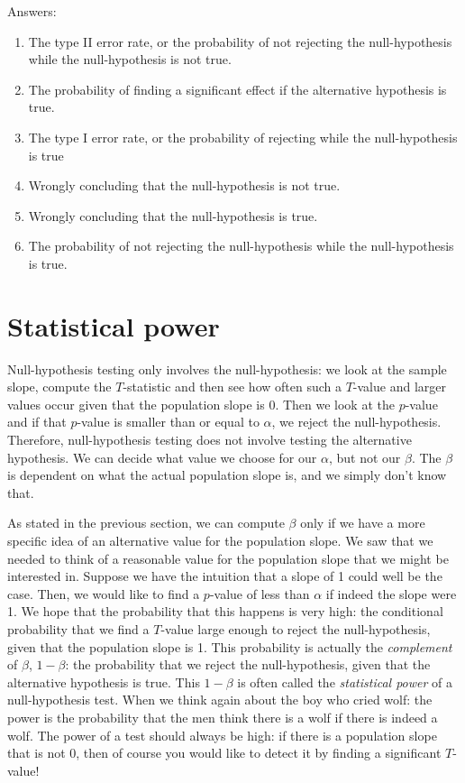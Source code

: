 \documentclass[]{report}\usepackage[]{graphicx}\usepackage[]{color}
\begin{document}
Answers:

\begin{enumerate}

\item The type II error rate, or the probability of not rejecting the null-hypothesis while the null-hypothesis is not true.

\item The probability of finding a significant effect if the alternative hypothesis is true.

\item The type I error rate, or the probability of rejecting while the null-hypothesis is true

\item Wrongly concluding that the null-hypothesis is not true.

\item Wrongly concluding that the null-hypothesis is true.

\item The probability of not rejecting the null-hypothesis while the null-hypothesis is true.


\end{enumerate}


\section{Statistical power}

Null-hypothesis testing only involves the null-hypothesis: we look at the sample slope, compute the $T$-statistic and then see how often such a $T$-value and larger values occur given that the population slope is 0. Then we look at the $p$-value and if that $p$-value is smaller than or equal to $\alpha$, we reject the null-hypothesis. Therefore, null-hypothesis testing does not involve testing the alternative hypothesis. We can decide what value we choose for our $\alpha$, but not our $\beta$. The $\beta$ is dependent on what the actual population slope is, and we simply don't know that.

As stated in the previous section, we can compute $\beta$ only if we have a more specific idea of an alternative value for the population slope. We saw that we needed to think of a reasonable value for the population slope that we might be interested in. Suppose we have the intuition that a slope of 1 could well be the case. Then, we would like to find a $p$-value of less than $\alpha$ if indeed the slope were 1. We hope that the probability that this happens is very high: the conditional probability that we find a $T$-value large enough to reject the null-hypothesis, given that the population slope is 1. This probability is actually the \textit{complement} of $\beta$, $1-\beta$: the probability that we reject the null-hypothesis, given that the alternative hypothesis is true. This $1-\beta$ is often called the \textit{statistical power} of a null-hypothesis test. When we think again about the boy who cried wolf: the power is the probability that the men think there is a wolf if there is indeed a wolf. The power of a test should always be high: if there is a population slope that is not 0, then of course you would like to detect it by finding a significant $T$-value!
\end{document}
